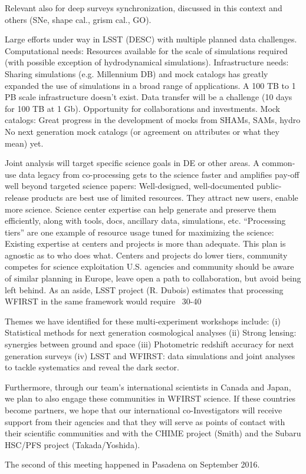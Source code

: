 Relevant also for deep surveys synchronization, discussed in this context and others (SNe, shape cal., grism cal., GO).

Large efforts under way in LSST (DESC) with multiple planned data challenges.
Computational needs:
 Resources available for the scale of simulations required (with possible exception of hydrodynamical simulations).
Infrastructure needs:
Sharing simulations (e.g. Millennium DB) and mock catalogs has greatly  expanded the use of simulations in a broad range of applications.
A 100 TB to 1 PB scale infrastructure doesn’t exist.
Data transfer will be a challenge (10 days for 100 TB at 1 Gb).
Opportunity for collaborations and investments.
Mock catalogs:
Great progress in the development of mocks from SHAMs, SAMs, hydro
No next generation mock catalogs (or agreement on attributes or what they mean) yet.

Joint analysis will target specific science goals in DE or other areas.  A common-use data legacy from co-processing gets to the science faster and amplifies pay-off well beyond targeted science papers:
Well-designed, well-documented public-release products are best use of limited resources.
They attract new users, enable more science.
Science center expertise can help generate and preserve them efficiently, along with tools, docs, ancillary data, simulations, etc.
“Processing tiers” are one example of resource usage tuned for maximizing the science:
Existing expertise at centers and projects is more than adequate.
This plan is agnostic as to who does what.
Centers and projects do lower tiers, community competes for science exploitation
U.S. agencies and community should be aware of similar planning in Europe, leave open a path to collaboration, but avoid being left behind.
As an aside, LSST project (R. Dubois) estimates that processing WFIRST in the same framework would require ~30-40%


Themes we have identified for these multi-experiment workshops include: (i) Statistical methods for next generation cosmological analyses (ii) Strong lensing: synergies between ground and space (iii) Photometric redshift accuracy for next generation surveys (iv) LSST and WFIRST: data simulations and joint analyses to tackle systematics and reveal the dark sector.


Furthermore, through our team's international scientists in Canada and Japan, we plan to also engage these communities in WFIRST science.  If these  countries become partners, we hope that our international co-Investigators will receive support from their agencies and that they will serve as points of contact with their scientific communities and with the CHIME project (Smith) and the Subaru HSC/PFS project (Takada/Yoshida).


The second of this meeting happened in Pasadena on September 2016.
